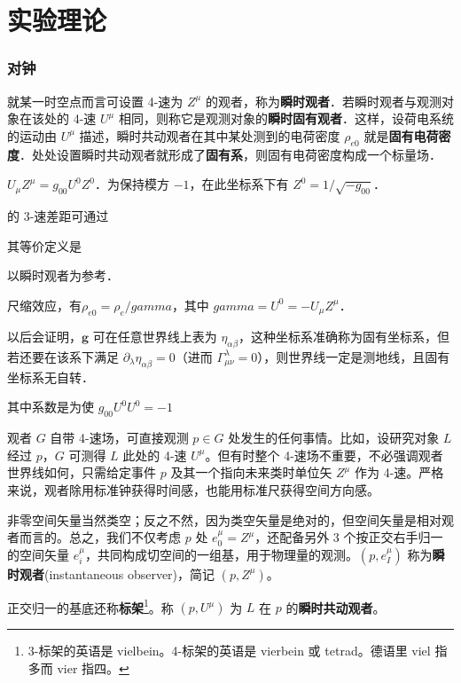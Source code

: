 \chapter{实验理论}\label{chpt:experiment}

\subsection{对钟}
就某一时空点而言可设置 4-速为 $Z^\mu$ 的观者，称为\textbf{瞬时观者}．若瞬时观者与观测对象在该处的 4-速 $U^\mu$ 相同，则称它是观测对象的\textbf{瞬时固有观者}．这样，设荷电系统的运动由 $U^\mu$ 描述，瞬时共动观者在其中某处测到的电荷密度 $\rho_{e0}$ 就是\textbf{固有电荷密度}．处处设置瞬时共动观者就形成了\textbf{固有系}，则固有电荷密度构成一个标量场．


$U_\mu Z^\mu=g_{00} U^0 Z^0$．为保持模方 $-1$，在此坐标系下有 $Z^0=1/\sqrt{-g_{00}}$．

的 3-速差距可通过




其等价定义是
 

以瞬时观者为参考．

尺缩效应，有$\rho_{e0}=\rho_e/gamma$，其中 $gamma=U^0=-U_\mu Z^\mu$．

以后会证明，$\bm g$ 可在任意世界线上表为 $\eta_{\alpha\beta}$，这种坐标系准确称为固有坐标系，但若还要在该系下满足 $\partial_\lambda\eta_{\alpha\beta}=0$（进而 $\Gamma^\lambda_{\mu\nu}=0$），则世界线一定是测地线，且固有坐标系无自转．

其中系数是为使 $g_{00}U^0U^0=-1$

观者 $G$ 自带 4-速场，可直接观测 $p\in G$ 处发生的任何事情。比如，设研究对象 $L$ 经过 $p$，$G$ 可测得 $L$ 此处的 4-速 $U^\mu$。但有时整个 4-速场不重要，不必强调观者世界线如何，只需给定事件 $p$ 及其一个指向未来类时单位矢 $Z^\mu$ 作为 4-速。严格来说，观者除用标准钟获得时间感，也能用标准尺获得空间方向感。

非零空间矢量当然类空；反之不然，因为类空矢量是绝对的，但空间矢量是相对观者而言的。总之，我们不仅考虑 $p$ 处 $e_0^\mu=Z^\mu$，还配备另外 3 个按正交右手归一的空间矢量 $e_i^\mu$，共同构成切空间的一组基，用于物理量的观测。$(p,e_I^\mu)$ 称为\textbf{瞬时观者}(instantaneous observer)，简记 $(p,Z^\mu)$。

正交归一的基底还称\textbf{标架}\footnote{3-标架的英语是 vielbein。4-标架的英语是 vierbein 或 tetrad。德语里 viel 指多而 vier 指四。}。称 $(p,U^\mu)$ 为 $L$ 在 $p$ 的\textbf{瞬时共动观者}。



